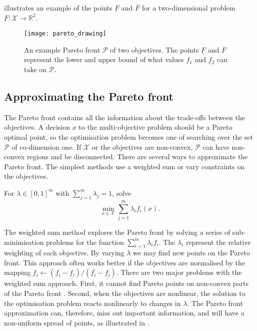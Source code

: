 \documentclass[main.tex]{subfiles}
\begin{document}
\begin{example}
   illustrates an example of the points
  $\underline{F}$ and $\overline{F}$ %
  for a two-dimensional problem $F:\mathcal{X}\to\mathbb{R}^2$.
  \begin{figure}[htbp]
    \centering
    \texttt{[image: pareto\_drawing]}
    \caption[An example Pareto front for two objectives]{An example Pareto front $\mathcal{P}$ of two
      objectives. The points $\underline{F}$ and $\overline{F}$
      represent the
      lower and upper bound of what values
      $f_1$ and $f_2$ can take on $\mathcal{P}$.}\label{fig:pareto_drawing}
  \end{figure}
\end{example}

\subsection{Approximating the Pareto front}\label{sec:multi_pareto_front}
The Pareto front contains all the information about the trade-offs between the
objectives. A decision $x$ to the multi-objective problem
should be a Pareto optimal point, so the
optimisation problem becomes one of searching over the set
$\mathcal{P}$ of co-dimension one. If $\mathcal{X}$ or the objectives are non-convex,
$\mathcal{P}$ can have non-convex regions and be
disconnected.
There are several ways to approximate the Pareto front. The simplest
methods use a weighted sum or vary constraints on the objectives.

\begin{mydef}
  For $\lambda \in {[0,1]}^m$ with $\sum_{j=1}^m\lambda_j = 1$, solve
  \begin{equation}
    \min_{x\in\mathcal{X}} \sum_{j=1}^m \lambda_i f_i(x).
  \end{equation}
\end{mydef}
The weighted sum method explores the Pareto front by solving a series
of sub-minimisation problems for the function $\sum_{i=1}^m\lambda_i f_i$.
The $\lambda_i$ represent the relative weighting of each
objective. By varying $\lambda$  we may find new points on the Pareto front.
This approach often works better if the objectives are normalised by the
mapping $f_i\leftarrow (f_i-\underline
{f_i})/(\overline{f_i}-\underline{f_i})$.
There are two major problems with the weighted sum approach. First,
it cannot find Pareto points on non-convex parts of the Pareto
front \citep{messac2000aggregate}.
Second, when the objectives are nonlinear, the solution to the
optimisation problem reacts nonlinearly to changes in $\lambda$.
The Pareto front approximation can, therefore, miss out important
information, and will
have a non-uniform spread of points, as illustrated in
.
\end{document}
